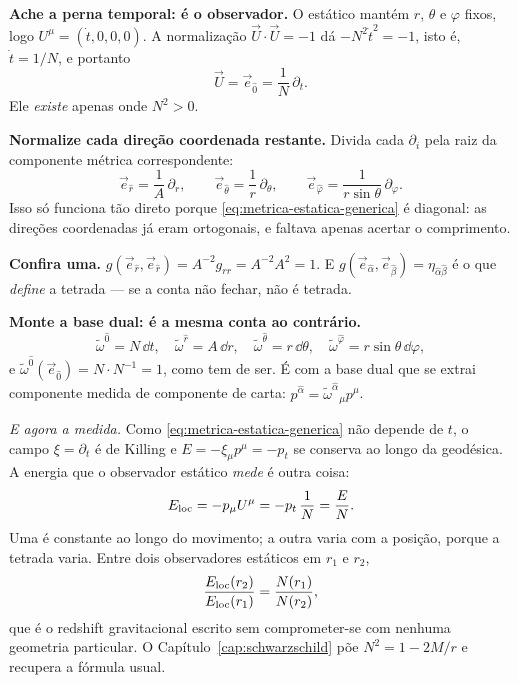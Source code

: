 \documentclass[12pt,a4paper,oneside]{book}
\theoremstyle{rgplain}
\theoremstyle{rgremark}
\begin{document}
\begin{infografico}
\begin{etapas}
  \item \textbf{Ache a perna temporal: é o observador.} O estático mantém $r$,
  $\theta$ e $\varphi$ fixos, logo $U^\mu=(\dot t,0,0,0)$. A normalização
  $\vec U\cdot\vec U=-1$ dá $-N^2\dot t^2=-1$, isto é, $\dot t=1/N$, e portanto
  \[
    \vec U=\vec e_{\hat0}=\frac{1}{N}\,\partial_t .
  \]
  Ele \emph{existe} apenas onde $N^2>0$.

  \item \textbf{Normalize cada direção coordenada restante.} Divida cada
  $\partial_i$ pela raiz da componente métrica correspondente:
  \[
    \vec e_{\hat r}=\frac{1}{A}\,\partial_r ,
    \qquad
    \vec e_{\hat\theta}=\frac{1}{r}\,\partial_\theta ,
    \qquad
    \vec e_{\hat\varphi}=\frac{1}{r\sin\theta}\,\partial_\varphi .
  \]
  Isso só funciona tão direto porque \eqref{eq:metrica-estatica-generica} é
  diagonal: as direções coordenadas já eram ortogonais, e faltava
  apenas acertar o comprimento.

  \item \textbf{Confira uma.}
  $g(\vec e_{\hat r},\vec e_{\hat r})=A^{-2}g_{rr}=A^{-2}A^2=1$. E
  $g(\vec e_{\hat\alpha},\vec e_{\hat\beta})=\eta_{\hat\alpha\hat\beta}$ é o que
  \emph{define} a tetrada --- se a conta não fechar, não é tetrada.

  \item \textbf{Monte a base dual: é a mesma conta ao contrário.}
  \[
    \tilde\omega^{\hat0}=N\,\dd t ,
    \quad
    \tilde\omega^{\hat r}=A\,\dd r ,
    \quad
    \tilde\omega^{\hat\theta}=r\,\dd\theta ,
    \quad
    \tilde\omega^{\hat\varphi}=r\sin\theta\,\dd\varphi ,
  \]
  e $\tilde\omega^{\hat0}(\vec e_{\hat0})=N\cdot N^{-1}=1$, como tem de ser.
  É com a base dual que se extrai componente medida de componente de carta:
  $p^{\hat\alpha}=\tilde\omega^{\hat\alpha}{}_\mu p^\mu$.
\end{etapas}
\end{infografico}

\emph{E agora a medida.} Como \eqref{eq:metrica-estatica-generica} não
depende de $t$, o campo $\xi=\partial_t$ é de Killing e
$E=-\xi_\mu p^\mu=-p_t$ se conserva ao longo da geodésica. A energia que o
observador estático \emph{mede} é outra coisa:
\begin{equation}
  E_{\rm loc}=-p_\mu U^\mu=-p_t\,\frac{1}{N}=\frac{E}{N} .
  \label{eq:energia-local-N}
\end{equation}
Uma é constante ao longo do movimento; a outra varia com a posição, porque a
tetrada varia. Entre dois observadores estáticos em $r_1$ e $r_2$,
\[
  \frac{E_{\rm loc}(r_2)}{E_{\rm loc}(r_1)}=\frac{N(r_1)}{N(r_2)} ,
\]
que é o redshift gravitacional escrito sem comprometer-se com nenhuma
geometria particular. O Capítulo~\ref{cap:schwarzschild} põe
$N^2=1-2M/r$ e recupera a fórmula usual.
\end{document}
